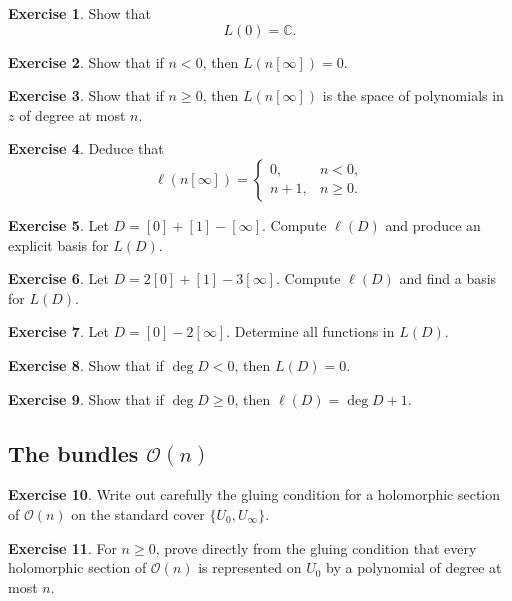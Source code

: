 \documentclass[11pt]{article}
\newcommand{\C}{\mathbb{C}}
\newcommand{\OO}{\mathcal{O}}
\newcommand{\degd}{\operatorname{deg}}
\newcommand{\ellD}{\ell}
\theoremstyle{plain}
\theoremstyle{definition}
\newtheorem{exercise}{Exercise}
\begin{document}
\begin{exercise}
Show that
\[
L(0)=\C.
\]
\end{exercise}

\begin{exercise}
Show that if $n<0$, then $L(n[\infty])=0$.
\end{exercise}

\begin{exercise}
Show that if $n\ge 0$, then $L(n[\infty])$ is the space of polynomials in $z$ of degree at most $n$.
\end{exercise}

\begin{exercise}
Deduce that
\[
\ellD(n[\infty])=
\begin{cases}
0,& n<0,\\
n+1,& n\ge 0.
\end{cases}
\]
\end{exercise}

\begin{exercise}
Let $D=[0]+[1]-[\infty]$. Compute $\ellD(D)$ and produce an explicit basis for $L(D)$.
\end{exercise}

\begin{exercise}
Let $D=2[0]+[1]-3[\infty]$. Compute $\ellD(D)$ and find a basis for $L(D)$.
\end{exercise}

\begin{exercise}
Let $D=[0]-2[\infty]$. Determine all functions in $L(D)$.
\end{exercise}

\begin{exercise}
Show that if $\degd D<0$, then $L(D)=0$.
\end{exercise}

\begin{exercise}
Show that if $\degd D\ge 0$, then $\ellD(D)=\degd D+1$.
\end{exercise}

\subsection*{The bundles \texorpdfstring{$\OO(n)$}{O(n)}}
\begin{exercise}
Write out carefully the gluing condition for a holomorphic section of $\OO(n)$ on the standard cover $\{U_0,U_{\infty}\}$.
\end{exercise}

\begin{exercise}
For $n\ge 0$, prove directly from the gluing condition that every holomorphic section of $\OO(n)$ is represented on $U_0$ by a polynomial of degree at most $n$.
\end{exercise}
\end{document}
